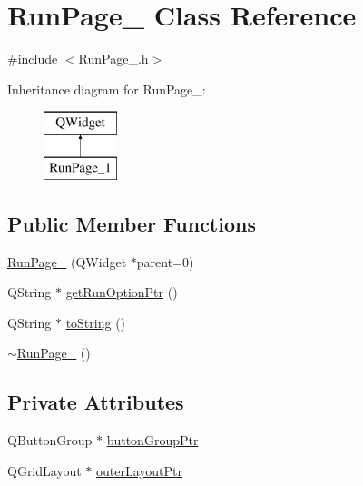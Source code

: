 \hypertarget{class_run_page__1}{\section{Run\-Page\-\_ Class Reference}
\label{class_run_page__1}
}


{\ttfamily \#include $<$Run\-Page\-\_.\-h$>$}

Inheritance diagram for Run\-Page\-\_\-:\begin{figure}[H]
\begin{center}
\leavevmode
\includegraphics[height=2.000000cm]{class_run_page__1}
\end{center}
\end{figure}
\subsection*{Public Member Functions}
\begin{DoxyCompactItemize}
\item 
\hyperlink{class_run_page__1_ad82b0ef9923370cba82eb4cbabc93545}{Run\-Page\-\_} (Q\-Widget $\ast$parent=0)
\item 
Q\-String $\ast$ \hyperlink{class_run_page__1_a4c13dfea0a52e4256539769a11981e03}{get\-Run\-Option\-Ptr} ()
\item 
Q\-String $\ast$ \hyperlink{class_run_page__1_a87003006f1f962dc85ca7ddfecf0c5ec}{to\-String} ()
\item 
\hyperlink{class_run_page__1_a2f02b6cad18bd083be7a3caed9341de1}{$\sim$\-Run\-Page\-\_} ()
\end{DoxyCompactItemize}
\subsection*{Private Attributes}
\begin{DoxyCompactItemize}
\item 
Q\-Button\-Group $\ast$ \hyperlink{class_run_page__1_a951be96108a118e057257ae1ea6a7b88}{button\-Group\-Ptr}
\item 
Q\-Grid\-Layout $\ast$ \hyperlink{class_run_page__1_a28dd1443caf175454399a1f47c719a2a}{outer\-Layout\-Ptr}
\end{DoxyCompactItemize}



